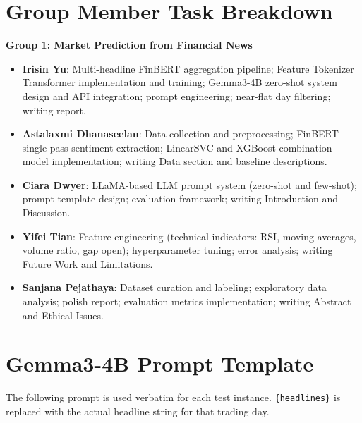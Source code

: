 \documentclass[11pt]{article}
\begin{document}
\section*{Group Member Task Breakdown}

\textbf{Group 1: Market Prediction from Financial News}

\begin{itemize}
  \item \textbf{Irisin Yu}: Multi-headline FinBERT aggregation pipeline; Feature Tokenizer Transformer implementation and training; Gemma3-4B zero-shot system design and API integration; prompt engineering; near-flat day filtering; writing report.
  \item \textbf{Astalaxmi Dhanaseelan}: Data collection and preprocessing; FinBERT single-pass sentiment extraction; LinearSVC and XGBoost combination model implementation; writing Data section and baseline descriptions.
  \item \textbf{Ciara Dwyer}: LLaMA-based LLM prompt system (zero-shot and few-shot); prompt template design; evaluation framework; writing Introduction and Discussion.
  \item \textbf{Yifei Tian}: Feature engineering (technical indicators: RSI, moving averages, volume ratio, gap open); hyperparameter tuning; error analysis; writing Future Work and Limitations.
  \item \textbf{Sanjana Pejathaya}: Dataset curation and labeling; exploratory data analysis; polish report; evaluation metrics implementation; writing Abstract and Ethical Issues.
\end{itemize}



\appendix

\section{Gemma3-4B Prompt Template}
\label{sec:prompt}

The following prompt is used verbatim for each test instance. \texttt{\{headlines\}} is replaced with the actual headline string for that trading day.
\end{document}
